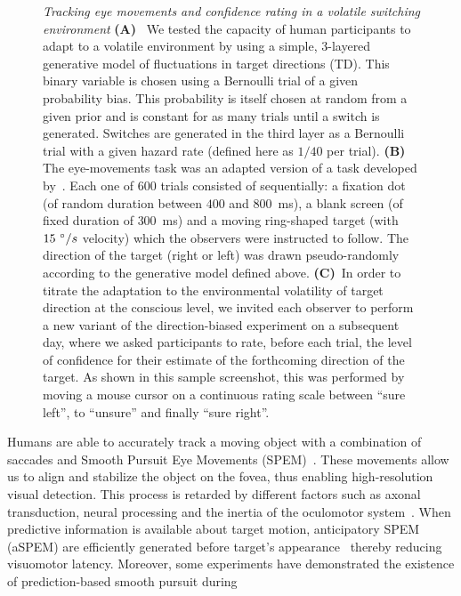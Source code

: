 \documentclass[12pt,english]{article}%
\newcommand{\ms}{\si{\milli\second}}%
\newcommand{\citep}[1]{\parencite{#1}}
\newcommand{\citet}[1]{\textcite{#1}}
\begin{document}
\begin{figure}
\caption{
\emph{Tracking eye movements and confidence rating in a volatile switching environment}
\textbf{(A)}~
We tested the capacity of human participants to adapt to a volatile environment 
by using a simple, 3-layered generative model of fluctuations in target directions (TD).
This binary variable is chosen using a Bernoulli trial of a given probability bias.
This probability is itself chosen at random from a given prior 
and is constant for as many trials until a switch is generated.
Switches are generated in the third layer as a Bernoulli trial 
with a given hazard rate (defined here as $1/40$ per trial).
\textbf{(B)}~
The eye-movements task was an adapted version of a task developed by~\citet{Montagnini2010}. 
Each one of $600$ trials consisted of sequentially:
a fixation dot (of random duration between $400$ and $800$~\ms),
a blank screen (of fixed duration of  $300$~\ms) and
a moving ring-shaped target (with $15~\degree/s$ velocity) which the observers were instructed to follow.
The direction of the target (right or left) was drawn pseudo-randomly
according to the generative model defined above. 
\textbf{(C)}~In order to titrate the adaptation 
to the environmental volatility of target direction at the conscious level,
we invited each observer to perform a new variant of the direction-biased experiment on a subsequent day,
where we asked participants to rate, before each trial, the level of confidence
for their estimate of the forthcoming direction of the target.
As shown in this sample screenshot,
this was performed by moving a mouse cursor on a continuous rating scale
between ``sure left'', to ``unsure'' and finally ``sure right''.
}
\label{fig:intro}
\end{figure}
Humans are able to accurately track a moving object
with a combination of saccades and
Smooth Pursuit Eye Movements (SPEM)~\citep{ref}.
These movements allow us to align and
stabilize the object on the fovea,
thus enabling high-resolution visual detection.
This process is retarded by different factors such as axonal transduction,
neural processing and the inertia of the oculomotor system~\citep{Krauzlis89}.
When predictive information is available about target motion,
anticipatory SPEM (aSPEM) are
efficiently generated before target's appearance~\citep{Westheimer1954, Kowler1979a, Kowler1979b} thereby reducing visuomotor latency.
Moreover, some experiments have demonstrated the existence
of prediction-based smooth pursuit during
\end{document}

